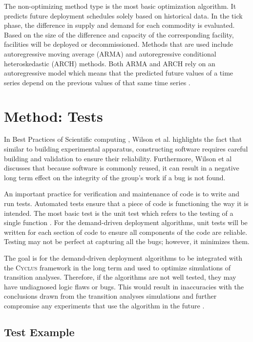 \documentclass{anstrans}
\newcommand{\Cyclus}{\textsc{Cyclus}\xspace}%
\begin{document}
The non-optimizing method type is the most basic optimization algorithm. It predicts future deployment schedules solely based on historical data. In the tick phase, the difference in supply and demand for each commodity is evaluated. Based on the size of the difference and capacity of the corresponding facility, facilities will be deployed or decommissioned. Methods that are used include autoregressive moving average (ARMA) and autoregressive conditional heteroskedastic (ARCH) methods. Both ARMA and ARCH rely on an autoregressive model which means that the predicted future values of a time series depend on the previous values of that same time series \cite{scopatz_technical_2016}.

\section{Method: Tests}
In Best Practices of Scientific computing \cite{wilson_best_2014}, Wilson et 
al. highlights the fact that similar to building experimental apparatus, 
constructing software requires careful building and validation to ensure their 
reliability. Furthermore, Wilson et al discusses that because software is 
commonly reused, it can result in a negative long term effect on the integrity 
of the group's work if a bug is not found. 

An important practice for verification and maintenance of code is to write and 
run tests. Automated tests ensure that a piece of code 
is functioning the way it is intended. The most basic test is the unit test 
which refers to the testing of a single function \cite{wilson_best_2014}. For 
the demand-driven deployment algorithms, unit tests will be written for each 
section of code to ensure all components of the code are reliable. Testing may 
not be perfect at capturing all the bugs; however, it minimizes them. 

The goal is for the demand-driven deployment algorithms to be integrated with 
the \Cyclus framework in the long term and used to optimize simulations of 
transition analyses. Therefore, if the algorithms are not well tested, they may 
have undiagnosed logic flaws or bugs. This would result in inaccuracies with 
the conclusions drawn from the transition analyses simulations and further 
compromise any experiments that use the algorithm in the future 
\cite{wilson_best_2014}. 

\subsection{Test Example} 
\end{document}
